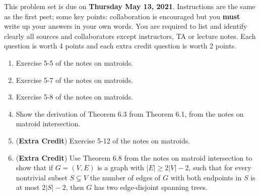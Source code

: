 \documentclass[12pt]{article} 
\begin{document}

\medskip
This problem set is due on \textbf{Thursday May 13, 2021}. Instructions are the same as the first pset; some key points: collaboration is encouraged but you {\bf must} write up
your answers in your own words. You are required to list and identify clearly all sources and collaborators except instructors, TA or lecture notes. Each question is worth 4 points and each extra credit question is worth 2 points.

\begin{enumerate}
\item
Exercise 5-5 of the notes on matroids.
\item
Exercise 5-7 of the notes on matroids.
\item
Exercise 5-8 of the notes on matroids. 
\item

Show the derivation of Theorem 6.3 from Theorem 6.1, from the notes on matroid intersection.
\item ({\bf Extra Credit}) Exercise 5-12 of the notes on matroids. 
\item
({\bf Extra Credit}) Use Theorem 6.8 from the notes on matroid intersection to show that if $G = (V,E)$ is a graph with $|E| \ge 2|V|-2$, such that for every nontrivial subset $S \subsetneq V$ the number of edges of $G$ with both endpoints in $S$ is at most $2|S|-2$, then $G$ has two edge-disjoint spanning trees.

\end{enumerate}
\end{document}
